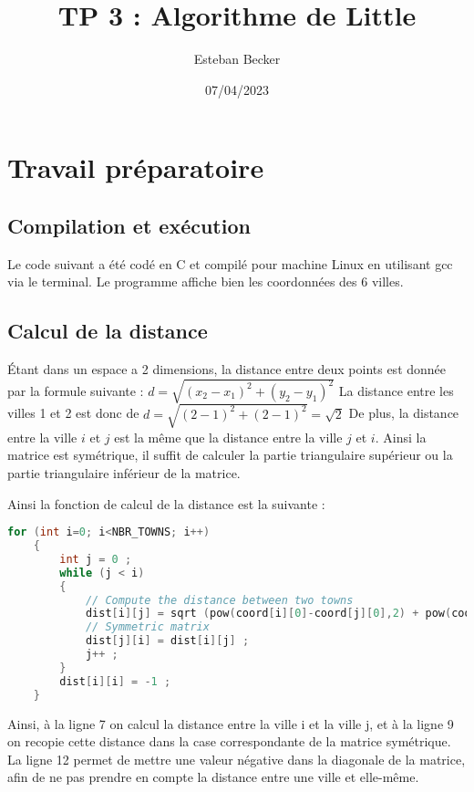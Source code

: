 \documentclass[11pt]{article}
\author{Esteban Becker}
\date{07/04/2023}
\title{TP 3 :  Algorithme de Little}
\begin{document}
\maketitle

\tableofcontents
\newpage

\section{Travail préparatoire}

\subsection{Compilation et exécution}

Le code suivant a été codé en C et compilé pour machine Linux en utilisant gcc via le terminal.
Le programme affiche bien les coordonnées des 6 villes.

\subsection{Calcul de la distance}

Étant dans un espace a 2 dimensions, la distance entre deux points est donnée par la formule suivante : $d = \sqrt{(x_2 - x_1)^2 + (y_2 - y_1)^2}$
La distance entre les villes 1 et 2 est donc de $d = \sqrt{(2 - 1)^2 + (2 - 1)^2} = \sqrt{2}$
De plus, la distance entre la ville $i$ et $j$ est la même que la distance entre la ville $j$ et $i$. Ainsi la matrice est symétrique, il suffit de calculer la partie triangulaire supérieur ou la partie triangulaire inférieur de la matrice.

Ainsi la fonction de calcul de la distance est la suivante :
\begin{lstlisting}[language=C]
for (int i=0; i<NBR_TOWNS; i++)
    {
        int j = 0 ;
        while (j < i)
        {
            // Compute the distance between two towns
            dist[i][j] = sqrt (pow(coord[i][0]-coord[j][0],2) + pow(coord[i][1]-coord[j][1],2)) ;
            // Symmetric matrix
            dist[j][i] = dist[i][j] ;
            j++ ;
        }
        dist[i][i] = -1 ; 
    }
\end{lstlisting}

Ainsi, à la ligne 7 on calcul la distance entre la ville i et la ville j, et à la ligne 9 on recopie cette distance dans la case correspondante de la matrice symétrique.
La ligne 12 permet de mettre une valeur négative dans la diagonale de la matrice, afin de ne pas prendre en compte la distance entre une ville et elle-même.
\end{document}
